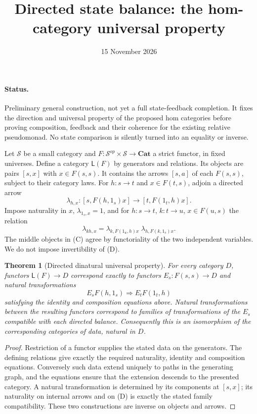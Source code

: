 \documentclass[11pt]{article}
\title{Directed state balance: the hom-category universal property}
\date{15 November 2026}
\newtheorem{theorem}{Theorem}
\begin{document}
\maketitle
\paragraph{Status.} Preliminary general construction, not yet a full state-feedback completion. It fixes the direction and universal property of the proposed hom categories before proving composition, feedback and their coherence for the existing relative pseudomonad. No state comparison is silently turned into an equality or inverse.

Let $\mathcal S$ be a small category and $F:\mathcal S^{op}\times\mathcal S\to\mathbf{Cat}$ a strict functor, in fixed universes. Define a category $\mathsf L(F)$ by generators and relations. Its objects are pairs $[s,x]$ with $x\in F(s,s)$. It contains the arrows $[s,a]$ of each $F(s,s)$, subject to their category laws. For $h:s\to t$ and $x\in F(t,s)$, adjoin a directed arrow
\[
 \lambda_{h,x}:[s,F(h,1_s)x]\longrightarrow[t,F(1_t,h)x].
\tag{D}
\]
Impose naturality in $x$, $\lambda_{1_s,x}=1$, and for $h:s\to t$, $k:t\to u$, $x\in F(u,s)$ the relation
\[
 \lambda_{kh,x}=\lambda_{k,F(1_u,h)x}\;\lambda_{h,F(k,1_s)x}.
\tag{C}
\]
The middle objects in (C) agree by functoriality of the two independent variables. We do not impose invertibility of (D).

\begin{theorem}[Directed dinatural universal property]
For every category $D$, functors $\mathsf L(F)\to D$ correspond exactly to functors $E_s:F(s,s)\to D$ and natural transformations
\[
 E_sF(h,1_s)\Rightarrow E_tF(1_t,h)
\]
satisfying the identity and composition equations above. Natural transformations between the resulting functors correspond to families of transformations of the $E_s$ compatible with each directed balance. Consequently this is an isomorphism of the corresponding categories of data, natural in $D$.
\end{theorem}
\begin{proof}
Restriction of a functor supplies the stated data on the generators. The defining relations give exactly the required naturality, identity and composition equations. Conversely such data extend uniquely to paths in the generating graph, and the equations ensure that the extension descends to the presented category. A natural transformation is determined by its components at $[s,x]$; its naturality on internal arrows and on (D) is exactly the stated family compatibility. These two constructions are inverse on objects and arrows.
\end{proof}
\end{document}
